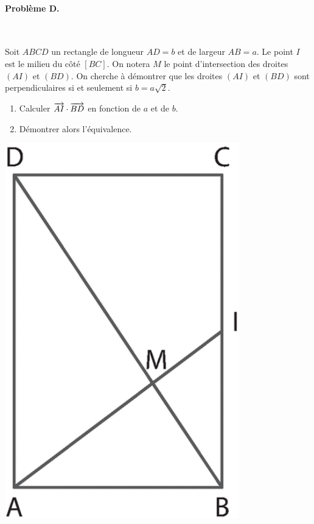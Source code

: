 \documentclass[11pt]{article}
\begin{document}
\paragraph{Problème D.}~\\
\begin{minipage}[]{.6\textwidth}
  Soit $ABCD$ un rectangle de longueur $AD=b$ et de largeur $AB=a$. Le point $I$
  est le milieu du côté $\left[ BC \right]$. On notera $M$ le point
  d'intersection des droites $\left( AI \right)$ et $\left( BD \right)$. On
  cherche à démontrer que les droites $\left( AI \right)$ et $\left( BD
  \right)$ sont perpendiculaires si et seulement si $b=a\sqrt2$.
  \begin{enumerate}
    \item Calculer $\overrightarrow{AI}\cdot\overrightarrow{BD}$ en fonction de $a$ et de $b$.
    \item Démontrer alors l'équivalence.
  \end{enumerate}
\end{minipage}
\begin{minipage}[]{.4\textwidth}
  \begin{center}
    \includegraphics[scale=.2]{pb4.png}
  \end{center}
\end{minipage}
\end{document}
